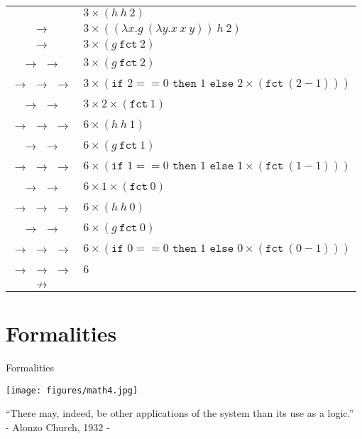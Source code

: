 \documentclass[11pt]{beamer}
\begin{document}
\begin{frame}[fragile=singleslide]{}

\begin{center}
\begin{tabular}{c l}
 & $3 \times (h\:h\:2)$ \\
$\rightarrow$ & $3 \times ((\lambda x.g\:(\lambda y. x\:x\:y))\:h\:2)$ \\
$\rightarrow$ & $3 \times (g\:\texttt{fct}\:2)$ \\
$\rightarrow$ $\rightarrow$ & $3 \times (g\:\texttt{fct}\:2)$ \\
$\rightarrow$ $\rightarrow$ $\rightarrow$ & $3 \times (\texttt{if } 2 == 0 \texttt{ then } 1 \texttt{ else } 2 \times (\texttt{fct}\:(2 - 1)))$ \\
$\rightarrow$ $\rightarrow$ & $3 \times 2 \times (\texttt{fct}\:1)$ \\
$\rightarrow$ $\rightarrow$ $\rightarrow$ & $6 \times (h\:h\:1)$ \\
$\rightarrow$ $\rightarrow$ & $6 \times (g\:\texttt{fct}\:1)$ \\
$\rightarrow$ $\rightarrow$ $\rightarrow$ & $6 \times (\texttt{if } 1 == 0 \texttt{ then } 1 \texttt{ else } 1 \times (\texttt{fct}\:(1 - 1)))$ \\
$\rightarrow$ $\rightarrow$ & $6 \times 1 \times (\texttt{fct}\:0)$ \\
$\rightarrow$ $\rightarrow$ $\rightarrow$ & $6 \times (h\:h\:0)$ \\
$\rightarrow$ $\rightarrow$ & $6 \times (g\:\texttt{fct}\:0)$ \\
$\rightarrow$ $\rightarrow$ $\rightarrow$ & $6 \times (\texttt{if } 0 == 0 \texttt{ then } 1 \texttt{ else } 0 \times (\texttt{fct}\:(0 - 1)))$ \\
$\rightarrow$ $\rightarrow$ $\rightarrow$ & $6$ \\
$\nrightarrow$ & \\
\end{tabular}
\end{center}

\end{frame}

\section[Formalities]{Formalities}
\begin{frame}[fragile=singleslide]{Formalities}
\begin{center}
\texttt{[image: figures/math4.jpg]}

``There may, indeed, be other applications of the system than its use as a logic.'' \\
- Alonzo Church, 1932 - 
\end{center}

\end{frame}
\end{document}

